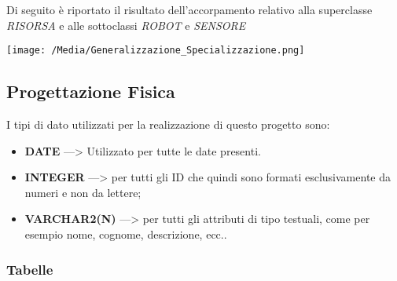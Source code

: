 \documentclass{article}
\begin{document}
Di seguito è riportato il risultato dell'accorpamento relativo alla superclasse \textit{RISORSA} e alle sottoclassi \textit{ROBOT} e \textit{SENSORE}

\texttt{[image: /Media/Generalizzazione\_Specializzazione.png]}

\subsection{Progettazione Fisica}

I tipi di dato utilizzati per la realizzazione di questo progetto sono:

\begin{itemize}
    \item \textbf{DATE} —> Utilizzato per tutte le date presenti.
    \item \textbf{INTEGER} —> per tutti gli ID che quindi sono formati esclusivamente da numeri e non da lettere;
    \item \textbf{VARCHAR2(N)} —> per tutti gli attributi di tipo testuali, come per esempio nome, cognome, descrizione, ecc..
\end{itemize}

\subsubsection{Tabelle}
\end{document}
